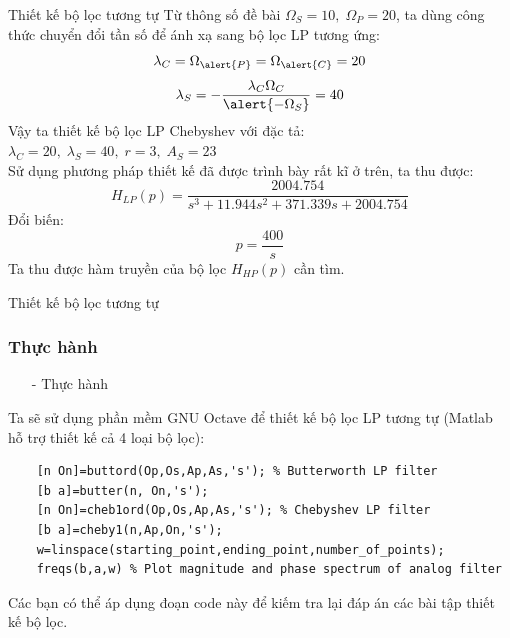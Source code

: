 \documentclass[8pt]{beamer}
\begin{document}
\begin{frame}{Thiết kế bộ lọc tương tự}
Từ thông số đề bài $\Omega_{S}=10,\;\Omega_{P}=20$, ta dùng công thức chuyển đổi tần số để ánh xạ sang bộ lọc LP tương ứng:
$$\lambda_{C}=\Omega_{\alert{P}}=\Omega_{\alert{C}}=20$$
$$\lambda_{S}=-\frac{\lambda_{C}\Omega_{C}}{\alert{-\Omega_{S}}}=40$$
Vậy ta thiết kế bộ lọc LP Chebyshev với đặc tả: $\lambda_{C}=20,\;\lambda_{S}=40,\;r=3,\;A_{S}=23$
\\ Sử dụng phương pháp thiết kế đã được trình bày rất kĩ ở trên, ta thu được:
$$H_{LP}(p)=\frac{2004.754}{s^3+11.944s^2+371.339s+2004.754}$$
Đổi biến: $$p=\frac{400}{s}$$
Ta thu được hàm truyền của bộ lọc $H_{HP}(p)$ cần tìm.
\end{frame}
\begin{frame}[fragile]{Thiết kế bộ lọc tương tự}
\subsubsection{Thực hành}
\begin{itemize}
	\item[-] Thực hành
\end{itemize}
Ta sẽ sử dụng phần mềm GNU Octave để thiết kế bộ lọc LP tương tự (Matlab hỗ trợ thiết kế cả 4 loại bộ lọc):
\begin{verbatim}
	[n On]=buttord(Op,Os,Ap,As,'s'); % Butterworth LP filter
	[b a]=butter(n, On,'s');
	[n On]=cheb1ord(Op,Os,Ap,As,'s'); % Chebyshev LP filter
	[b a]=cheby1(n,Ap,On,'s'); 
	w=linspace(starting_point,ending_point,number_of_points);
	freqs(b,a,w) % Plot magnitude and phase spectrum of analog filter
\end{verbatim}
Các bạn có thể áp dụng đoạn code này để kiếm tra lại đáp án các bài tập thiết kế bộ lọc.
\end{frame}
\end{document}
